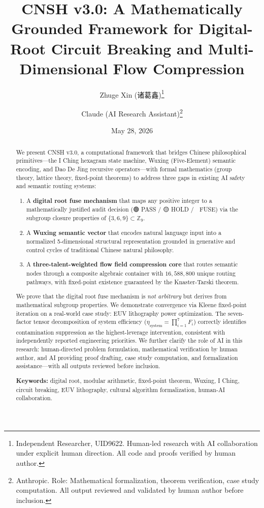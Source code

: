 \documentclass[twocolumn]{article}
\title{CNSH v3.0: A Mathematically Grounded Framework for Digital-Root Circuit Breaking and Multi-Dimensional Flow Compression}
\author{
  Zhuge Xin (诸葛鑫)\thanks{Independent Researcher, UID9622. Human-led research with AI collaboration under explicit human direction. All code and proofs verified by human author.}
  \and
  Claude (AI Research Assistant)\thanks{Anthropic. Role: Mathematical formalization, theorem verification, case study computation. All output reviewed and validated by human author before inclusion.}
}
\date{May 28, 2026}
\begin{document}
\maketitle

\begin{abstract}

We present CNSH v3.0, a computational framework that bridges Chinese philosophical primitives—the I Ching hexagram state machine, Wuxing (Five-Element) semantic encoding, and Dao De Jing recursive operators—with formal mathematics (group theory, lattice theory, fixed-point theorems) to address three gaps in existing AI safety and semantic routing systems:

\begin{enumerate}
  \item A \textbf{digital root fuse mechanism} that maps any positive integer to a mathematically justified audit decision (🟢 PASS / 🟡 HOLD / 🔴 FUSE) via the subgroup closure properties of $\{3,6,9\} \subset \mathbb{Z}_9$.
  \item A \textbf{Wuxing semantic vector} that encodes natural language input into a normalized 5-dimensional structural representation grounded in generative and control cycles of traditional Chinese natural philosophy.
  \item A \textbf{three-talent-weighted flow field compression core} that routes semantic nodes through a composite algebraic container with $16{,}588{,}800$ unique routing pathways, with fixed-point existence guaranteed by the Knaster-Tarski theorem.
\end{enumerate}

We prove that the digital root fuse mechanism is \emph{not arbitrary} but derives from mathematical subgroup properties. We demonstrate convergence via Kleene fixed-point iteration on a real-world case study: EUV lithography power optimization. The seven-factor tensor decomposition of system efficiency ($\eta_{\text{system}} = \prod_{i=1}^{7} F_i$) correctly identifies contamination suppression as the highest-leverage intervention, consistent with independently reported engineering priorities. We further clarify the role of AI in this research: human-directed problem formulation, mathematical verification by human author, and AI providing proof drafting, case study computation, and formalization assistance—with all outputs reviewed before inclusion.

\textbf{Keywords:} digital root, modular arithmetic, fixed-point theorem, Wuxing, I Ching, circuit breaking, EUV lithography, cultural algorithm formalization, human-AI collaboration.

\end{abstract}
\end{document}
